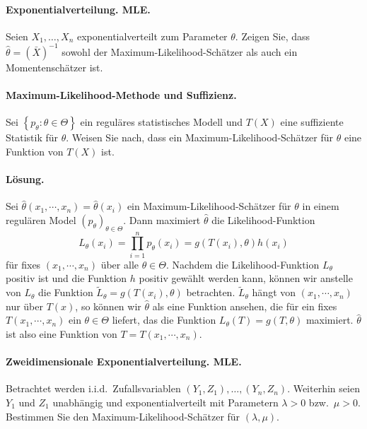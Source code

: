 \paragraph{Exponentialverteilung. MLE.} Seien $X_1,\ldots,X_n$
exponentialverteilt zum Parameter $\theta$. Zeigen Sie, dass $\hat \theta =
(\bar X)^{-1}$ sowohl der Maximum-Likelihood-Schätzer als auch ein
Momentenschätzer ist.


\paragraph{Maximum-Likelihood-Methode und Suffizienz.}
Sei $\left\{ p_\theta : \theta\in\Theta \right\}$ ein reguläres statistisches
Modell und $T\left( X \right)$ eine suffiziente Statistik für $\theta$. 
Weisen Sie nach, dass ein Maximum-Likelihood-Schätzer für $\theta$ 
eine Funktion von $T\left( X \right)$ ist.

\paragraph*{Lösung.} Sei $\hat\theta(x_1, \cdots, x_n)=\hat \theta(x_i)$ ein 
Maximum-Likelihood-Schätzer für $\theta$ in einem regulären Model $\left( p_\theta \right)_{\theta\in\Theta}$. Dann maximiert $\hat\theta$ die Likelihood-Funktion
\begin{equation*}
    L_\theta(x_i) = \prod_{i=1}^{n} p_{\theta}(x_i) = g\left( T(x_i), \theta \right) h(x_i)
\end{equation*}
für fixes $(x_1, \cdots, x_n)$ über alle $\theta\in\Theta$. Nachdem die
Likelihood-Funktion $L_\theta$ positiv ist und die Funktion $h$ positiv gewählt
werden kann, können wir anstelle von $L_\theta$ die Funktion $\tilde L_\theta =
g(T(x_i), \theta)$ betrachten. $\tilde L_\theta$ hängt von $(x_1,\cdots,x_n)$
nur über $T(x)$, so können wir $\hat\theta$ als eine Funktion ansehen, die
für ein fixes $T(x_1, \cdots, x_n)$ ein $\theta\in\Theta$ liefert, das die
Funktion $L_\theta(T)=g(T,\theta)$ maximiert. $\hat \theta$ ist also eine
Funktion von $T=T(x_1,\cdots,x_n)$.




\paragraph{Zweidimensionale Exponentialverteilung. MLE.} Betrachtet werden 
i.i.d.\ Zufallsvariablen $(Y_1, Z_1), \ldots,(Y_n,Z_n)$. Weiterhin seien
$Y_1$ und $Z_1$ unabhängig und exponentialverteilt mit Parametern
$\lambda > 0$ bzw.\ $\mu > 0$. Bestimmen Sie den Maximum-Likelihood-Schätzer
für $(\lambda,\mu)$.

